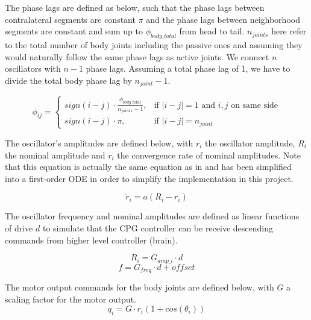 \documentclass{cmc}
\begin{document}
The phase lags are defined as below, such that the phase lags between contralateral segments are constant $\pi$ and the phase lags between neighborhood segments are constant and sum up to $\phi_{body\_total}$ from head to tail. $n_{joints}$ here refer to the total number of body joints including the passive ones and assuming they would naturally follow the same phase lags as active joints. We connect $n$ oscillators with $n-1$ phase lags. Assuming a total phase lag of 1, we have to divide the total body phase lag by $n_{joint}-1$.

\begin{equation}
  \label{eq:phicw}
  \phi_{ij} =
    \begin{cases}
    sign(i-j)\cdot\frac{\phi_{body\_total}}{n_{joints}-1},& \text{if } |i-j|=1 \text{ and } i,j \text{ on same side}\\
    sign(i-j)\cdot\pi,& \text{if } |i-j|=n_{joint}
    \end{cases}
\end{equation}


The oscillator's amplitudes are defined below, with $ r_i $ the
oscillator amplitude, $ R_i $ the nominal amplitude and $ r_i $ the
convergence rate of nominal amplitudes. Note that this equation is actually the same equation as in \cite{ijspeert2007swimming} and has been simplified into a first-order ODE in order to simplify the implementation in this project.

\begin{equation}
  \label{eq:dr}
  \dot{r}_i = a (R_i - r_i)
\end{equation}

The oscillator frequency and nominal amplitudes are defined as linear functions of drive $d$ to simulate that the CPG controller can be receive descending commands from higher level controller (brain).

\begin{equation}
  \label{eq:amp}
  R_i = G_{amp\_i}\cdot d
\end{equation}
\begin{equation}
  \label{eq:freq}
  f = G_{freq}\cdot d + offset
\end{equation}

The motor output commands for the body joints are defined below, with $G$ a scaling factor for the motor output.
\begin{equation}
  \label{eq:output_body}
  q_i = G\cdot r_i(1 + cos(\theta_i))
\end{equation}
\end{document}
